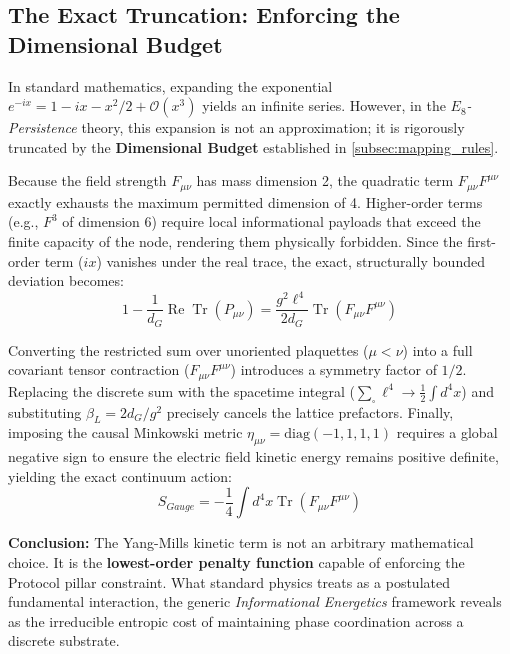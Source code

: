 \subsection{The Exact Truncation: Enforcing the Dimensional Budget}
In standard mathematics, expanding the exponential $e^{-ix} = 1 - ix - x^2/2 + \mathcal{O}(x^3)$ yields an infinite series. However, in the \textit{$E_8$-Persistence} theory, this expansion is not an approximation; it is rigorously truncated by the \textbf{Dimensional Budget} established in \cref{subsec:mapping_rules}. 

Because the field strength $F_{\mu\nu}$ has mass dimension 2, the quadratic term $F_{\mu\nu} F^{\mu\nu}$ exactly exhausts the maximum permitted dimension of 4. Higher-order terms (e.g., $F^3$ of dimension 6) require local informational payloads that exceed the finite capacity of the node, rendering them physically forbidden. Since the first-order term ($ix$) vanishes under the real trace, the exact, structurally bounded deviation becomes:
\begin{equation}
    1 - \frac{1}{d_G}\operatorname{Re} \operatorname{Tr}(P_{\mu\nu}) = \frac{g^2 \ell^4}{2d_G} \operatorname{Tr}(F_{\mu\nu} F^{\mu\nu})
\end{equation}

Converting the restricted sum over unoriented plaquettes ($\mu < \nu$) into a full covariant tensor contraction ($F_{\mu\nu}F^{\mu\nu}$) introduces a symmetry factor of $1/2$. Replacing the discrete sum with the spacetime integral ($\sum_{\square} \ell^4 \to \frac{1}{2} \int d^4x$) and substituting $\beta_L = 2d_G/g^2$ precisely cancels the lattice prefactors. Finally, imposing the causal Minkowski metric $\eta_{\mu\nu} = \text{diag}(-1, 1, 1, 1)$ requires a global negative sign to ensure the electric field kinetic energy remains positive definite, yielding the exact continuum action:
\begin{equation}
    S_{Gauge} = - \frac{1}{4} \int d^4x \operatorname{Tr}(F_{\mu\nu} F^{\mu\nu})
\end{equation}

\textbf{Conclusion:} The Yang-Mills kinetic term is not an arbitrary mathematical choice. It is the \textbf{lowest-order penalty function} capable of enforcing the Protocol pillar constraint. What standard physics treats as a postulated fundamental interaction, the generic \textit{Informational Energetics} framework reveals as the irreducible entropic cost of maintaining phase coordination across a discrete substrate.